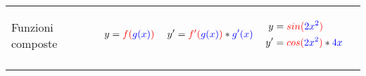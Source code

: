 \documentclass[../../main]{subfiles}
\begin{document}
\begin{center}
\begin{longtable}{ |p{5em} | p{5em} | p{5em} | p{7em} | p{2cm}| }
            \hline
            
            \begin{center}
                Funzioni composte
            \end{center} &
            \begin{align*}
                y= {\color{red}f({\color{blue}g(x)})} 
            \end{align*}  &
            \begin{align*}
                y'= {\color{red}f'({\color{blue}g(x)})} * {\color{blue}g'(x)} 
            \end{align*} &
            {
                \begin{align*}
                    y  &= {\color{red}sin({\color{blue}2x^2})}    \\
                    y' &= {\color{red}cos({\color{blue}2x^2})} * {\color{blue}4x}  
                \end{align*}
            } &
            \begin{center}
            \end{center} \\ 

            \hhline{|=|=|=|=|=|}
            
        \end{longtable}
\end{center}
\end{document}
